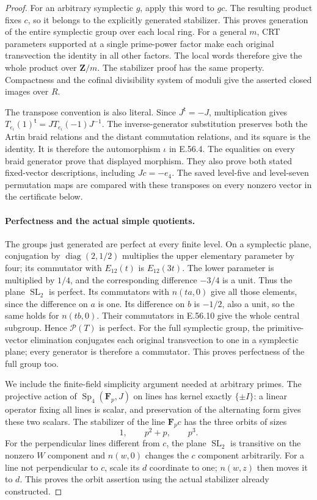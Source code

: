 \begin{proof}
For an arbitrary symplectic $g$, apply this word
to $gc$. The resulting product fixes $c$, so it
belongs to the explicitly generated stabilizer.
This proves generation of the entire symplectic
group over each local ring. For a general $m$,
CRT parameters supported at a single prime-power
factor make each original transvection the identity
in all other factors. The local words therefore
give the whole product over $\mathbf Z/m$.
The stabilizer proof has the same property.
Compactness and the cofinal divisibility system
of moduli give the asserted closed images over $R$.

The transpose convention is also literal.
Since $J^{\mathsf t}=-J$, multiplication gives
$T_{e_i}(1)^{\mathsf t}=JT_{e_i}(-1)J^{-1}$.
The inverse-generator substitution preserves both
the Artin braid relations and the distant commutation
relations, and its square is the identity.
It is therefore the automorphism $\iota$ in E.56.4.
The equalities on every braid generator prove that
displayed morphism. They also prove both stated
fixed-vector descriptions, including $Jc=-e_4$.
The saved level-five and level-seven permutation
maps are compared with these transposes on every
nonzero vector in the certificate below.

\paragraph{Perfectness and the actual simple quotients.}
The groups just generated are perfect at every
finite level. On a symplectic plane, conjugation
by $\operatorname{diag}(2,1/2)$ multiplies the
upper elementary parameter by four; its commutator
with $E_{12}(t)$ is $E_{12}(3t)$.
The lower parameter is multiplied by $1/4$, and
the corresponding difference $-3/4$ is a unit.
Thus the plane $\operatorname{SL}_2$ is perfect.
Its commutators with $n(ta,0)$ give all those
elements, since the difference on $a$ is one.
Its difference on $b$ is $-1/2$, also a unit,
so the same holds for $n(tb,0)$.
Their commutators in E.56.10 give the whole
central subgroup. Hence $\mathcal P(T)$ is perfect.
For the full symplectic group, the primitive-vector
elimination conjugates each original transvection
to one in a symplectic plane; every generator is
therefore a commutator. This proves perfectness
of the full group too.

We include the finite-field simplicity argument
needed at arbitrary primes. The projective action
of $\operatorname{Sp}_4(\mathbf F_p,J)$ on lines
has kernel exactly $\{\pm I\}$: a linear operator
fixing all lines is scalar, and preservation of
the alternating form gives these two scalars.
The stabilizer of the line $\mathbf F_pc$ has
the three orbits of sizes
\[
                    1,\qquad p^2+p,\qquad p^3.
 \tag{E.56.14}
\]
For the perpendicular lines different from $c$,
the plane $\operatorname{SL}_2$ is transitive on
the nonzero $W$ component and $n(w,0)$ changes
the $c$ component arbitrarily. For a line not
perpendicular to $c$, scale its $d$ coordinate
to one; $n(w,z)$ then moves it to $d$.
This proves the orbit assertion using the actual
stabilizer already constructed.


\end{proof}
